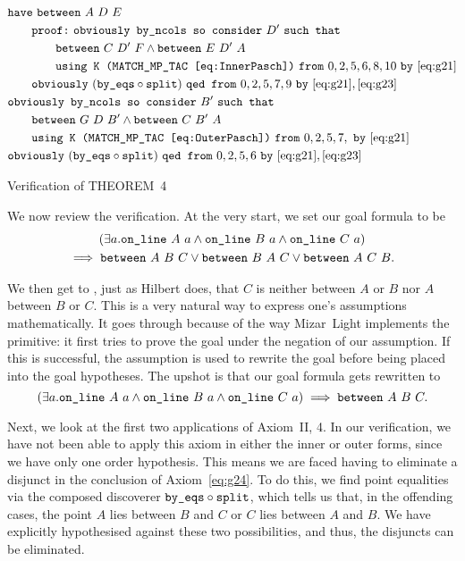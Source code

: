 \begin{boxedfigure}
\begin{align*}
&\code{have}\ \between{A}{D}{E}\\
&\qquad \code{proof:}\ \code{obviously by\_ncols so consider}\ D'\ \code{such that}\\
&\qquad\qquad\between{C}{D'}{F}\wedge\between{E}{D'}{A}\\
&\qquad\qquad\code{using K (MATCH\_MP\_TAC \eqref{eq:InnerPasch})}\ \code{from}\ 0,2,5,6,8,10\ \code{by}\ \eqref{eq:g21}\\
&\qquad\code{obviously}\ (\code{by\_eqs}\circ\code{split})\ \code{qed from}\ 0,2,5,7,9\ \code{by}\ \eqref{eq:g21},\eqref{eq:g23}\\
&\code{obviously by\_ncols so consider}\ B'\ \code{such that}\\
&\qquad\between{G}{D}{B'}\wedge\between{C}{B'}{A}\\
&\qquad\code{using K (MATCH\_MP\_TAC \eqref{eq:OuterPasch})}\ \code{from}\ 0,2,5,7,\ \code{by}\ \eqref{eq:g21}\\
&\code{obviously}\ (\code{by\_eqs}\circ\code{split})\ \code{qed from}\ 0,2,5,6\ \code{by}\ \eqref{eq:g21},\eqref{eq:g23}\\
\end{align*}
\caption{Verification of THEOREM~4}
\label{fig:FourVerification}
\end{boxedfigure}

We now review the verification. At the very start, we set our goal formula to be
\begin{multline*}
(\exists a. \code{on\_line}\ A\ a\wedge\code{on\_line}\ B\ a\wedge\code{on\_line}\ C\ a) \\\implies\between{A}{B}{C}\vee\between{B}{A}{C}\vee\between{A}{C}{B}.
\end{multline*}

We then get to , just as Hilbert does, that $C$ is neither between $A$ or $B$ nor $A$ between $B$ or $C$. This is a very natural way to express one's assumptions mathematically. It goes through because of the way Mizar~Light implements the  primitive: it first tries to prove the goal under the negation of our assumption. If this is successful, the assumption is used to rewrite the goal before being placed into the goal hypotheses. The upshot is that our goal formula gets rewritten to
\begin{displaymath}
(\exists a. \code{on\_line}\ A\ a\wedge\code{on\_line}\ B\ a\wedge\code{on\_line}\ C\ a) \implies\between{A}{B}{C}.
\end{displaymath}

Next, we look at the first two applications of Axiom~II, 4. In our verification, we have not been able to apply this axiom in either the inner or outer forms, since we have only one order hypothesis. This means we are faced having to eliminate a disjunct in the conclusion of Axiom~\ref{eq:g24}. To do this, we find point equalities via the composed discoverer $\texttt{by\_eqs}\circ\texttt{split}$, which tells us that, in the offending cases, the point $A$ lies between $B$ and $C$ or $C$ lies between $A$ and $B$. We have explicitly hypothesised against these two possibilities, and thus, the disjuncts can be eliminated.

